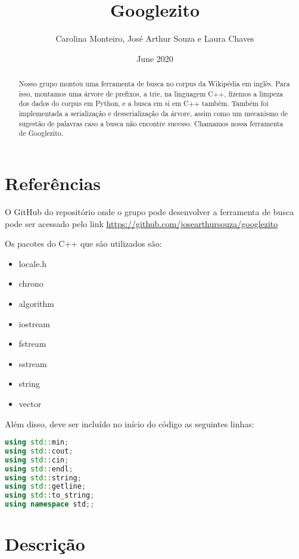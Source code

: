 \documentclass{article}
\title{Googlezito}
\author{Carolina Monteiro, José Arthur Souza e Laura Chaves }
\date{June 2020}
\begin{document}
\maketitle

\begin{abstract}
    
    Nosso grupo montou uma ferramenta de busca no corpus da Wikipédia em inglês. Para isso, montamos uma árvore de prefixos, a trie, na linguagem C++, fizemos a limpeza dos dados do corpus em Python, e a busca em si em C++ também. Também foi implementada a serialização e desserialização da árvore, assim como um mecanismo de sugestão de palavras caso a busca não encontre sucesso. Chamamos nossa ferramenta de Googlezito.
    
\end{abstract}

\section{Referências}

O GitHub do repositório onde o grupo pode desenvolver a ferramenta de busca pode ser acessado pelo link \url{https://github.com/josearthursouza/googlezito}

Os pacotes do C++ que são utilizados são:

\begin{itemize}
    \item locale.h
    \item chrono
    \item algorithm
    \item iostream
    \item fstream
    \item sstream
    \item string
    \item vector
\end{itemize}

Além disso, deve ser incluído no início do código as seguintes linhas:

\begin{lstlisting}[language=C++]
using std::min;
using std::cout;
using std::cin;
using std::endl;
using std::string;
using std::getline;
using std::to_string;
using namespace std;;

\end{lstlisting}

\section{Descrição}
\end{document}

